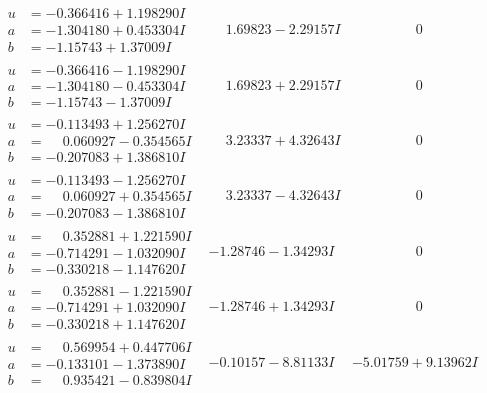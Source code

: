 \documentclass[1p]{elsarticle_modified}
\theoremstyle{definition}
\begin{document}
$$\begin{array}{c|c|c}
\begin{aligned}
u &= -0.366416 + 1.198290 I \\
a &= -1.304180 + 0.453304 I \\
b &= -1.15743 + 1.37009 I\end{aligned}
 & \phantom{-}1.69823 - 2.29157 I & \phantom{-0.000000 } 0 \\ \hline\begin{aligned}
u &= -0.366416 - 1.198290 I \\
a &= -1.304180 - 0.453304 I \\
b &= -1.15743 - 1.37009 I\end{aligned}
 & \phantom{-}1.69823 + 2.29157 I & \phantom{-0.000000 } 0 \\ \hline\begin{aligned}
u &= -0.113493 + 1.256270 I \\
a &= \phantom{-}0.060927 - 0.354565 I \\
b &= -0.207083 + 1.386810 I\end{aligned}
 & \phantom{-}3.23337 + 4.32643 I & \phantom{-0.000000 } 0 \\ \hline\begin{aligned}
u &= -0.113493 - 1.256270 I \\
a &= \phantom{-}0.060927 + 0.354565 I \\
b &= -0.207083 - 1.386810 I\end{aligned}
 & \phantom{-}3.23337 - 4.32643 I & \phantom{-0.000000 } 0 \\ \hline\begin{aligned}
u &= \phantom{-}0.352881 + 1.221590 I \\
a &= -0.714291 - 1.032090 I \\
b &= -0.330218 - 1.147620 I\end{aligned}
 & -1.28746 - 1.34293 I & \phantom{-0.000000 } 0 \\ \hline\begin{aligned}
u &= \phantom{-}0.352881 - 1.221590 I \\
a &= -0.714291 + 1.032090 I \\
b &= -0.330218 + 1.147620 I\end{aligned}
 & -1.28746 + 1.34293 I & \phantom{-0.000000 } 0 \\ \hline\begin{aligned}
u &= \phantom{-}0.569954 + 0.447706 I \\
a &= -0.133101 - 1.373890 I \\
b &= \phantom{-}0.935421 - 0.839804 I\end{aligned}
 & -0.10157 - 8.81133 I & -5.01759 + 9.13962 I \\ \hline\begin{aligned}

\end{aligned}
\end{array}$$
\end{document}
